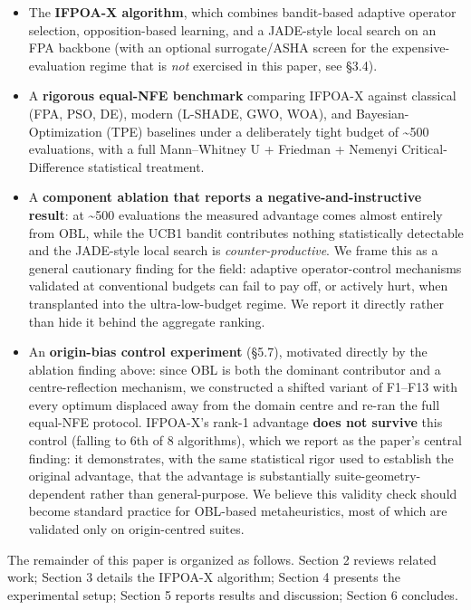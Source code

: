 \documentclass[preprint,12pt]{elsarticle}
\begin{document}
\begin{itemize}
\item The \textbf{IFPOA-X algorithm}, which combines bandit-based adaptive operator selection, opposition-based learning, and a JADE-style local search on an FPA backbone (with an optional surrogate/ASHA screen for the expensive-evaluation regime that is \emph{not} exercised in this paper, see \S3.4).
\item A \textbf{rigorous equal-NFE benchmark} comparing IFPOA-X against classical (FPA, PSO, DE), modern (L-SHADE, GWO, WOA), and Bayesian-Optimization (TPE) baselines under a deliberately tight budget of \textasciitilde500 evaluations, with a full Mann--Whitney U + Friedman + Nemenyi Critical-Difference \cite{derrac2011practical} statistical treatment.
\item A \textbf{component ablation that reports a negative-and-instructive result}: at \textasciitilde500 evaluations the measured advantage comes almost entirely from OBL, while the UCB1 bandit contributes nothing statistically detectable and the JADE-style local search is \emph{counter-productive}. We frame this as a general cautionary finding for the field: adaptive operator-control mechanisms validated at conventional budgets can fail to pay off, or actively hurt, when transplanted into the ultra-low-budget regime. We report it directly rather than hide it behind the aggregate ranking.
\item An \textbf{origin-bias control experiment} (\S5.7), motivated directly by the ablation finding above: since OBL is both the dominant contributor and a centre-reflection mechanism, we constructed a shifted variant of F1--F13 with every optimum displaced away from the domain centre and re-ran the full equal-NFE protocol. IFPOA-X's rank-1 advantage \textbf{does not survive} this control (falling to 6th of 8 algorithms), which we report as the paper's central finding: it demonstrates, with the same statistical rigor used to establish the original advantage, that the advantage is substantially suite-geometry-dependent rather than general-purpose. We believe this validity check should become standard practice for OBL-based metaheuristics, most of which are validated only on origin-centred suites.
\end{itemize}

The remainder of this paper is organized as follows. Section 2 reviews related work; Section 3 details the IFPOA-X algorithm; Section 4 presents the experimental setup; Section 5 reports results and discussion; Section 6 concludes.
\end{document}
